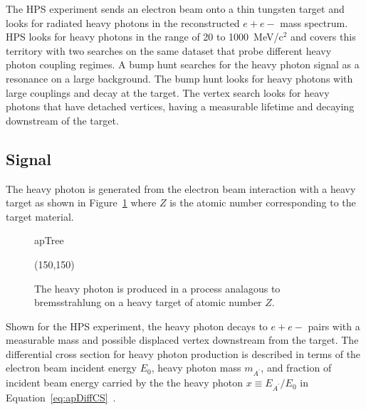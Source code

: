 The HPS experiment sends an electron beam onto a thin tungsten target and looks for radiated heavy photons in the reconstructed $e+e-$ mass spectrum. HPS looks for heavy photons in the range of 20 to 1000~MeV/c$^2$ and covers this territory with two searches on the same dataset that probe different heavy photon coupling regimes. A bump hunt searches for the heavy photon signal as a resonance on a large background. The bump hunt looks for heavy photons with large couplings and decay at the target. The vertex search looks for heavy photons that have detached vertices, having a measurable lifetime and decaying downstream of the target. 

\subsection{Signal}

The heavy photon is generated from the electron beam interaction with a heavy target as shown in Figure~\ref{fig:apTree} where $Z$ is the atomic number corresponding to the target material.  

\begin{figure}[H]
    \begin{center}
	\begin{fmffile}{apTree}
	\begin{fmfgraph*}(150,150)
	\fmfstraight
		\fmffreeze
		\fmffreeze	
	\end{fmfgraph*}
	\end{fmffile}
  	\end{center}
    	\caption[Heavy photon production in a fixed-target experiment]{The heavy photon is produced in a process analagous to bremsstrahlung on a heavy target of atomic number $Z$.}
   	 \label{fig:apTree}	
\end{figure}

Shown for the HPS experiment, the heavy photon decays to $e+e-$ pairs with a measurable mass and possible displaced vertex downstream from the target. The differential cross section for heavy photon production is described in terms of the electron beam incident energy $E_0$, heavy photon mass $m_{A^{\prime}}$, and fraction of incident beam energy carried by the the heavy photon $x\equiv E_{A^{\prime}}/E_0$ in Equation~\eqref{eq:apDiffCS}~\cite{bjorken_new_2009}. 

